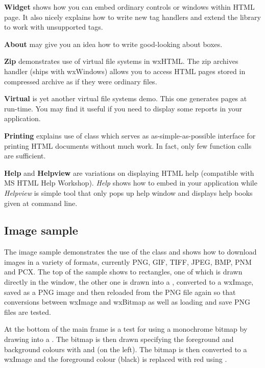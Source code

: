 {\bf Widget} shows how you can embed ordinary controls or windows within
HTML page. It also nicely explains how to write new tag handlers and extend
the library to work with unsupported tags.

{\bf About} may give you an idea how to write good-looking about boxes.

{\bf Zip} demonstrates use of virtual file systems in wxHTML. The zip archives
handler (ships with wxWindows) allows you to access HTML pages stored 
in compressed archive as if they were ordinary files.

{\bf Virtual} is yet another virtual file systems demo. This one generates pages at run-time.
You may find it useful if you need to display some reports in your application.

{\bf Printing} explains use of  
class which serves as as-simple-as-possible interface for printing HTML 
documents without much work. In fact, only few function calls are sufficient.

{\bf Help} and {\bf Helpview} are variations on displaying HTML help 
(compatible with MS HTML Help Workshop). {\it Help} shows how to embed 
 in your application
while {\it Helpview} is simple tool that only pops up help window and
displays help books given at command line.

\subsection{Image sample}\label{sampleimage}

The image sample demonstrates the use of the  class
and shows how to download images in a variety of formats, currently PNG, GIF,
TIFF, JPEG, BMP, PNM and PCX. The top of the sample shows to rectangles, one
of which is drawn directly in the window, the other one is drawn into a 
, converted to a wxImage, saved as a PNG image
and then reloaded from the PNG file again so that conversions between wxImage
and wxBitmap as well as loading and save PNG files are tested.

At the bottom of the main frame is a test for using a monochrome bitmap by
drawing into a . The bitmap is then drawn
specifying the foreground and background colours with 
 and 
 (on the left). The
bitmap is then converted to a wxImage and the foreground colour (black) is
replaced with red using .

